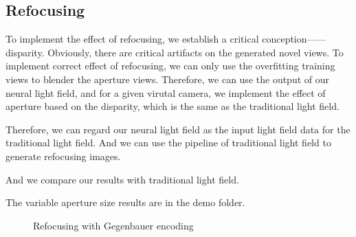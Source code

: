 \documentclass[acmtog]{acmart}
\begin{document}
\subsection{Refocusing}
    \qquad To implement the effect of refocusing, we establish a critical conception——disparity.  Obviously, there are critical artifacts on the generated novel views. To implement correct effect of refocusing, we can only use the overfitting training views to blender the aperture views. Therefore, we can use the output of our neural light field, and for a given virutal camera, we  implement the effect of aperture based on the disparity, which is the same as the traditional light field. 
    
    \quad Therefore, we can regard our neural light field as the input light field data for the traditional light field. And we can use the pipeline of traditional light field to generate refocusing images.
    
    \quad And we compare our results with traditional light field.

    \quad The variable aperture size results are in the demo folder. 
        
    \begin{figure}[h]
        \centering
        \quad
        \quad
        \quad
        \caption{Refocusing with Gegenbauer encoding}
    \end{figure}
\end{document}
